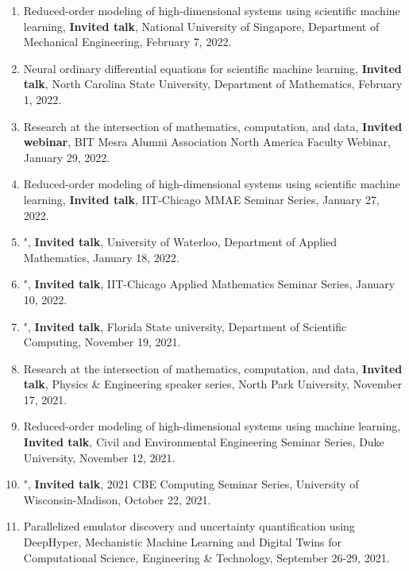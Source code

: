 \documentclass[letterpaper]{article}
\begin{document}
\begin{enumerate}

\item Reduced-order modeling of high-dimensional systems using scientific machine learning, \textbf{Invited talk}, National University of Singapore, Department of Mechanical Engineering, February 7, 2022.

\item Neural ordinary differential equations for scientific machine learning, \textbf{Invited talk}, North Carolina State University, Department of Mathematics, February 1, 2022.

\item Research at the intersection of mathematics, computation, and data, \textbf{Invited webinar}, BIT Mesra Alumni Association North America Faculty Webinar, January 29, 2022.

\item Reduced-order modeling of high-dimensional systems using scientific machine learning, \textbf{Invited talk}, IIT-Chicago MMAE Seminar Series, January 27, 2022.

\item ", \textbf{Invited talk}, University of Waterloo, Department of Applied Mathematics, January 18, 2022.

\item ", \textbf{Invited talk}, IIT-Chicago Applied Mathematics Seminar Series, January 10, 2022.

\item ", \textbf{Invited talk}, Florida State university, Department of Scientific Computing, November 19, 2021.

\item Research at the intersection of mathematics, computation, and data, \textbf{Invited talk}, Physics \& Engineering speaker series, North Park University, November 17, 2021.

\item Reduced-order modeling of high-dimensional systems using machine learning, \textbf{Invited talk}, Civil and Environmental Engineering Seminar Series, Duke University, November 12, 2021.

\item ", \textbf{Invited talk}, 2021 CBE Computing Seminar Series, University of Wisconsin-Madison, October 22, 2021.

\item Parallelized emulator discovery and uncertainty quantification using DeepHyper, Mechanistic Machine Learning and Digital Twins for Computational Science, Engineering \& Technology, September 26-29, 2021.


\end{enumerate}
\end{document}
